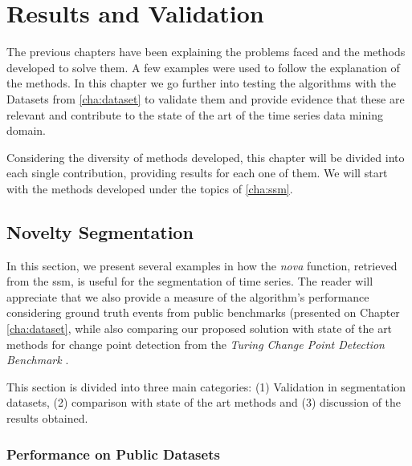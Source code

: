 

%

\chapter{Results and Validation}
\label{cha:results}

The previous chapters have been explaining the problems faced and the methods developed to solve them. A few examples were used to follow the explanation of the methods. In this chapter we go further into testing the algorithms with the Datasets from \ref{cha:dataset} to validate them and provide evidence that these are relevant and contribute to the state of the art of the time series data mining domain.
\par
Considering the diversity of methods developed, this chapter will be divided into each single contribution, providing results for each one of them. We will start with the methods developed under the topics of \ref{cha:ssm}.

\section{Novelty Segmentation}

In this section, we present several examples in how the \textit{nova} function, retrieved from the \gls{ssm}, is useful for the segmentation of time series. The reader will appreciate that we also provide a measure of the algorithm's performance considering ground truth events from public benchmarks (presented on Chapter \ref{cha:dataset}, while also comparing our proposed solution with state of the art methods for change point detection from the \textit{Turing Change Point Detection Benchmark} \cite{cpd_alan}.
\par
This section is divided into three main categories: (1) Validation in segmentation datasets, (2) comparison with state of the art methods and (3) discussion of the results obtained.

\subsection{Performance on Public Datasets}

